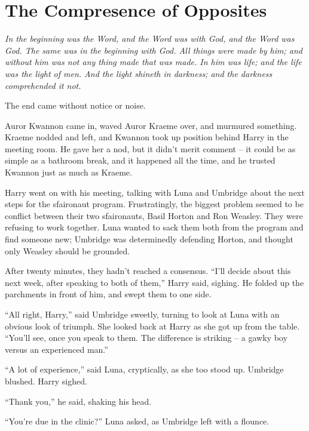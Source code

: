 \hypertarget{the-compresence-of-opposites}{%
\chapter{The Compresence of
Opposites}\label{the-compresence-of-opposites}}

\emph{In the beginning was the Word, and the Word was with God, and the
Word was God. The same was in the beginning with God. All things were
made by him; and without him was not any thing made that was made. In
him was life; and the life was the light of men. And the light shineth
in darkness; and the darkness comprehended it not.}


\mybreak

The end came without notice or noise.

Auror Kwannon came in, waved Auror Kraeme over, and murmured something.
Kraeme nodded and left, and Kwannon took up position behind Harry in the
meeting room. He gave her a nod, but it didn't merit comment -- it could
be as simple as a bathroom break, and it happened all the time, and he
trusted Kwannon just as much as Kraeme.

Harry went on with his meeting, talking with Luna and Umbridge about the
next steps for the sfaironaut program. Frustratingly, the biggest
problem seemed to be conflict between their two sfaironauts, Basil
Horton and Ron Weasley. They were refusing to work together. Luna wanted
to sack them both from the program and find someone new; Umbridge was
determinedly defending Horton, and thought only Weasley should be
grounded.

After twenty minutes, they hadn't reached a consensus. ``I'll decide
about this next week, after speaking to both of them,'' Harry said,
sighing. He folded up the parchments in front of him, and swept them to
one side.

``All right, Harry,'' said Umbridge sweetly, turning to look at Luna
with an obvious look of triumph. She looked back at Harry as she got up
from the table. ``You'll see, once you speak to them. The difference is
striking -- a gawky boy versus an experienced man.''

``A lot of experience,'' said Luna, cryptically, as she too stood up.
Umbridge blushed. Harry sighed.

``Thank you,'' he said, shaking his head.

``You're due in the clinic?'' Luna asked, as Umbridge left with a
flounce.

